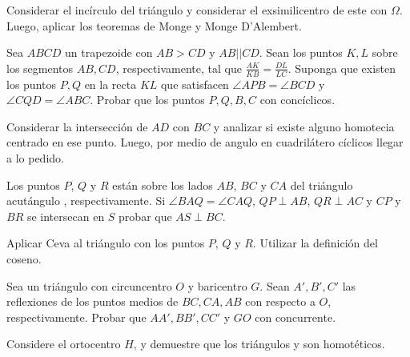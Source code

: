 \begin{hint}
    Considerar el incírculo del triángulo  y considerar el exsimilicentro de este con $\Omega$.
    Luego, aplicar los teoremas de Monge y Monge D'Alembert.
\end{hint}


\begin{section-problem}
    Sea $ABCD$ un trapezoide con $AB > CD$ y $AB || CD$.
    Sean los puntos $K, L$ sobre los segmentos $AB, CD$, respectivamente, tal que $\frac{AK}{KB} = \frac{DL}{LC}$.
    Suponga que existen los puntos $P, Q$ en la recta $KL$ que satisfacen $\angle APB = \angle BCD$ y $\angle CQD = \angle ABC$.
    Probar que los puntos $P, Q, B, C$ con concíclicos.
\end{section-problem}

\begin{hint}
    Considerar la intersección de $AD$ con $BC$ y analizar si existe alguno homotecia centrado en ese punto.
    Luego, por medio de angulo en cuadrilátero cíclicos llegar a lo pedido.
\end{hint}



\begin{section-problem}
    Los puntos $P$, $Q$ y $R$ están sobre los lados $AB$, $BC$ y $CA$ del triángulo acutángulo , respectivamente.
    Si $\angle BAQ = \angle CAQ$, $QP \perp AB$, $QR \perp AC$ y $CP$ y $BR$ se intersecan en $S$ probar que $AS \perp BC$.
\end{section-problem}

\begin{hint}
    Aplicar Ceva al triángulo  con los puntos $P$, $Q$ y $R$.
    Utilizar la definición del coseno.
\end{hint}



\begin{section-problem}
    Sea  un triángulo con circuncentro $O$ y baricentro $G$.
    Sean $A', B', C'$ las reflexiones de los puntos medios de $BC, CA, AB$ con respecto a $O$, respectivamente.
    Probar que $AA', BB', CC'$ y $GO$ con concurrente.
\end{section-problem}

\begin{hint}
    Considere el ortocentro $H$, y demuestre que los triángulos  y  son homotéticos.
\end{hint}


